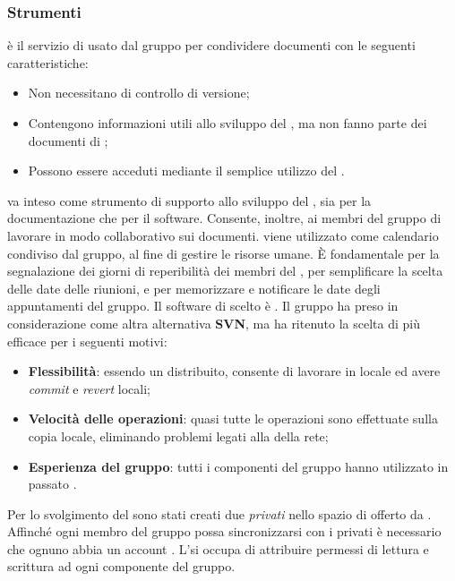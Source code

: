 \subsubsection{Strumenti}
\textbf{} è il servizio di  usato dal gruppo per condividere documenti con le seguenti caratteristiche:
\begin{itemize}
\item Non necessitano di controllo di versione;
\item Contengono informazioni utili allo sviluppo del , ma non fanno parte dei documenti di ;
\item Possono essere acceduti mediante il semplice utilizzo del  .
\end{itemize}
 va inteso come strumento di supporto allo sviluppo del , sia per la documentazione che per il software. Consente, inoltre, ai membri del gruppo di lavorare in modo collaborativo sui documenti.
\textbf{} viene utilizzato come calendario condiviso dal gruppo, al fine di gestire le risorse umane. \`E fondamentale per la segnalazione dei giorni di reperibilità dei membri del , per semplificare la scelta delle date delle riunioni, e per memorizzare e notificare le date degli appuntamenti del gruppo.
Il software di  scelto è \textbf{}. Il gruppo ha preso in considerazione come altra alternativa \textbf{SVN}, ma ha ritenuto la scelta di \textbf{} più efficace per i seguenti motivi:
\begin{itemize}
\item \textbf{Flessibilità}: essendo un  distribuito, \textbf{} consente di lavorare in locale ed avere \textit{commit} e \textit{revert} locali;
\item \textbf{Velocità delle operazioni}: quasi tutte le operazioni sono effettuate sulla copia locale, eliminando problemi legati alla  della rete;
\item \textbf{Esperienza del gruppo}: tutti i componenti del gruppo hanno utilizzato in passato \textbf{}.
\end{itemize}
Per lo svolgimento del  sono stati creati due  \textit{privati} nello spazio di  offerto da \textbf{}. Affinché ogni membro del gruppo possa sincronizzarsi con i  privati è necessario che ognuno abbia un account \textbf{}. L'\rAP si occupa di attribuire permessi di lettura e scrittura ad ogni componente del gruppo.
